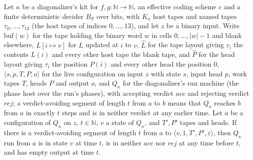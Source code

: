 \begin{theorem}
\label{Turing.NTimeDiag.dz_seg_read}
\leanok
{}
Let $\kappa$ be a diagonalizer's kit for $f, g : \mathbb{N} \to \mathbb{N}$, an effective coding scheme $c$ and a finite deterministic decider $B_F$ over bits, with $K_\kappa$ host tapes and named tapes $\tau_0, \dots, \tau_{13}$ (the host tapes of indices $0, \dots, 13$), and let $z$ be a binary input. Write $\mathrm{buf}(w)$ for the tape holding the binary word $w$ in cells $0, \dots, |w| - 1$ and blank elsewhere, $L[i \mapsto v]$ for $L$ updated at $i$ to $v$, $\hat L$ for the tape layout giving $\tau_i$ the contents $L(i)$ and every other host tape the blank tape, and $\hat P$ for the head layout giving $\tau_i$ the position $P(i)$ and every other head the position $0$, $\langle s, p, T, P, o\rangle$ for the live configuration on input $z$ with state $s$, input head $p$, work tapes $T$, heads $P$ and output $o$, and $Q_\kappa$ for the diagonalizer's run machine (the phase host over the run's phases), with accepting verdict $\mathit{acc}$ and rejecting verdict $\mathit{rej}$; a verdict-avoiding segment of length $t$ from $a$ to $b$ means that $Q_\kappa$ reaches $b$ from $a$ in exactly $t$ steps and is in neither verdict at any earlier time. Let $a$ be a configuration of $Q_\kappa$ on $z$, $t \in \mathbb{N}$, $v$ a state of $Q_\kappa$, and $T', P'$ tapes and heads. If there is a verdict-avoiding segment of length $t$ from $a$ to $\langle v, 1, T', P', \varepsilon\rangle$, then $Q_\kappa$ run from $a$ is in state $v$ at time $t$, is in neither $\mathit{acc}$ nor $\mathit{rej}$ at any time before $t$, and has empty output at time $t$.
\end{theorem}

